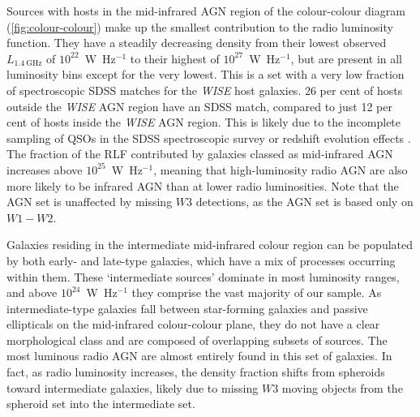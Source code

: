       Sources with hosts in the mid-infrared AGN region of the colour-colour diagram (\autoref{fig:colour-colour}) make
      up the smallest contribution to the radio luminosity function. They have
      a steadily decreasing density from their lowest observed $L_{1.4\ \mathrm{GHz}}$ of $10^{22}$~W~Hz$^{-1}$ to their highest of
      $10^{27}$~W~Hz$^{-1}$, but are present in all luminosity bins except for
      the very lowest. This is a set with a very low fraction of spectroscopic SDSS matches for the \emph{WISE} host galaxies. 26 per cent of
      hosts outside the \emph{WISE} AGN region have an SDSS match, compared to just 12 per
      cent of hosts inside the \emph{WISE} AGN region. This is likely due to the incomplete sampling of QSOs in the SDSS spectroscopic survey or redshift evolution effects \citep{strauss02sdss}. The fraction of the RLF contributed by galaxies classed as mid-infrared AGN increases above $10^{25}$~W~Hz$^{-1}$, meaning that high-luminosity radio AGN are also more likely to be infrared AGN than at lower radio luminosities. Note that the AGN set is unaffected by missing $W3$ detections, as the AGN set is based only on $W1-W2$.

      Galaxies residing in the intermediate mid-infrared colour region can be
      populated by both early- and late-type galaxies, which have a mix of
      processes occurring within them. These `intermediate sources' dominate in
      most luminosity ranges, and above $10^{24}$~W~Hz$^{-1}$ they comprise the
      vast majority of our sample. As intermediate-type galaxies fall between
      star-forming galaxies and passive ellipticals on the mid-infrared colour-colour plane, they do
      not have a clear morphological class and are composed of overlapping subsets of sources. The most luminous radio AGN are almost entirely found in
      this set of galaxies. In fact, as radio luminosity increases, the density
      fraction shifts from spheroids toward intermediate galaxies, likely due to missing $W3$ moving objects from the spheroid set into the intermediate set.

